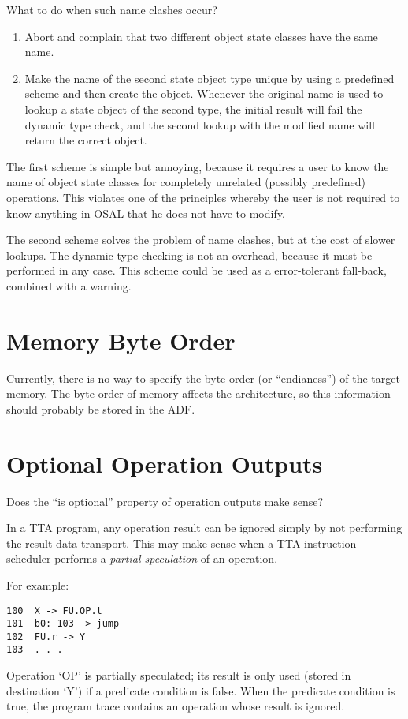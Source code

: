 \documentclass[twoside]{tce}
\begin{document}
What to do when such name clashes occur?
\begin{enumerate}
\item %
  Abort and complain that two different object state classes have the same
  name.
\item %
  Make the name of the second state object type unique by using a predefined
  scheme and then create the object.  Whenever the original name is used to
  lookup a state object of the second type, the initial result will
  fail the dynamic type check, and the second lookup with the modified name
  will return the correct object.
\end{enumerate}

The first scheme is simple but annoying, because it requires a user to know
the name of object state classes for completely unrelated (possibly
predefined) operations.  This violates one of the principles whereby the
user is not required to know anything in OSAL that he does not have to
modify.

The second scheme solves the problem of name clashes, but at the cost of
slower lookups.  The dynamic type checking is not an overhead, because it
must be performed in any case.  This scheme could be used as a
error-tolerant fall-back, combined with a warning.

\section{Memory Byte Order}
\label{sec:mem-byte-order}

Currently, there is no way to specify the byte order (or ``endianess'') of
the target memory.  The byte order of memory affects the architecture, so
this information should probably be stored in the ADF.

\section{Optional Operation Outputs}
\label{sec:optional-out}

Does the ``is optional'' property of operation outputs make sense?

In a TTA program, any operation result can be ignored simply by not
performing the result data transport.  This may make sense when a TTA
instruction scheduler performs a \emph{partial speculation} of an operation.

For example:
\begin{verbatim}
100  X -> FU.OP.t
101  b0: 103 -> jump
102  FU.r -> Y
103  . . .
\end{verbatim}
Operation `OP' is partially speculated; its result is only used (stored in
destination `Y') if a predicate condition is false.  When the predicate
condition is true, the program trace contains an operation whose result is
ignored.
\end{document}
